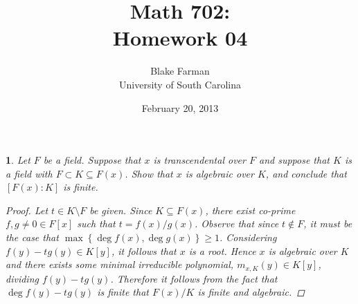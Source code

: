 \documentclass[10pt]{amsart}
\author{Blake Farman\\University of South Carolina}
\title{Math 702:\\Homework 04}
\date{February 20, 2013}
\begin{document}
\maketitle

\providecommand{\p}{\mathfrak{p}}
\providecommand{\m}{\mathfrak{m}}

\newtheorem{thm}{}
\newtheorem{lem}{Lemma}

\newcommand{\End}[2]{\operatorname{End}_{#1}\left(#2\right)}
\newcommand{\Hom}[2]{\operatorname{Hom}_{#1}\left(#2\right)}

\begin{thm}
  Let $F$ be a field.
  Suppose that $x$ is transcendental over $F$ and suppose that $K$ is a field with $F \subset K \subseteq F(x)$.
  Show that $x$ is algebraic over $K$, and conclude that $[F(x) : K]$ is finite.
  
  \begin{proof}
    Let $t \in K \setminus F$ be given.
    Since $K \subseteq F(x)$, there exist co-prime $f, g \neq 0 \in F[x]$ such that $t = f(x) / g(x)$.
    Observe that since $t \not \in F$, it must be the case that $\max\left\{\deg{f(x)}, \deg{g(x)}\right\} \geq 1$.
    Considering $f(y) - tg(y) \in K[y]$, it follows that $x$ is a root.
    Hence $x$ is algebraic over $K$ and there exists some minimal irreducible polynomial, $m_{x,K}(y) \in K[y]$, dividing $f(y) - tg(y)$.
    Therefore it follows from the fact that $\deg{f(y) - tg(y)}$ is finite that $F(x)/K$ is finite and algebraic.
  \end{proof}
\end{thm}
\end{document}
